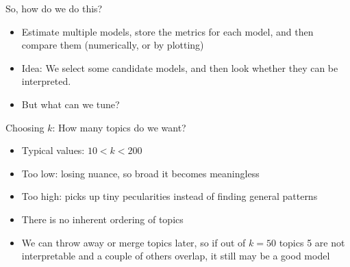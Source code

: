 \documentclass[handout]{beamer}
\begin{document}
\begin{frame}{So, how do we do this?}
	\begin{itemize}[<+->]
		\item Estimate multiple models, store the metrics for each model, and then compare them (numerically, or by plotting)
		\item Idea: We select some candidate models, and then look whether they can be interpreted.
		\item But what can we tune?
	\end{itemize}
\end{frame}


\begin{frame}{Choosing $k$: How many topics do we want?}
	\begin{itemize}
		\item Typical values: $10<k<200$
		\item Too low: losing nuance, so broad it becomes meaningless
		\item Too high: picks up tiny pecularities instead of finding general patterns
		\item There is no inherent ordering of topics
		\item We can throw away or merge topics later, so if out of $k=50$ topics 5 are not interpretable and a couple of others overlap, it still may be a good model
	\end{itemize}
\end{frame}


\end{document}
